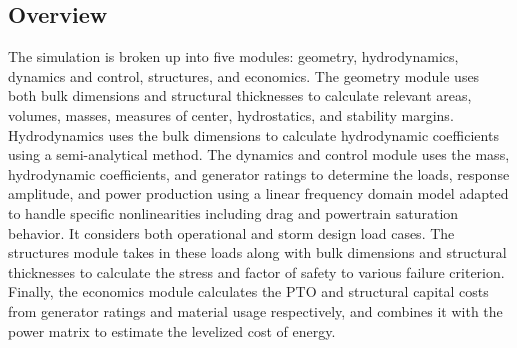 \subsection{Overview}
\label{sec:model-overview}
The simulation is broken up into five modules: geometry, hydrodynamics, dynamics and control, structures, and economics.
The geometry module uses both bulk dimensions and structural thicknesses to calculate relevant areas, volumes, masses, measures of center, hydrostatics, and stability margins.
Hydrodynamics uses the bulk dimensions to calculate hydrodynamic coefficients using a semi-analytical method.
The dynamics and control module uses the mass, hydrodynamic coefficients, and generator ratings to determine the loads, response amplitude, and power production using a linear frequency domain model adapted to handle specific nonlinearities including drag and powertrain saturation behavior.
It considers both operational and storm design load cases.
The structures module takes in these loads along with bulk dimensions and structural thicknesses to calculate the stress and factor of safety to various failure criterion.
Finally, the economics module calculates the PTO and structural capital costs from generator ratings and material usage respectively, and combines it with the power matrix to estimate the levelized cost of energy.

